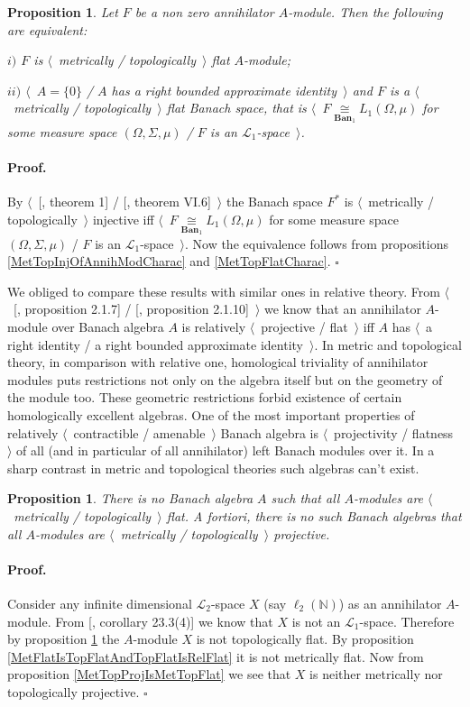 \documentclass[12pt]{article}
\newcommand{\isom}[1]{\mathop{\mathbin{\cong}}\limits_{#1}}
\newtheorem{proposition}[theorem]{Proposition}
\renewenvironment{proof}{\paragraph{Proof.}}{\hfill$\square$\medskip}
\begin{document}
\begin{proposition}\label{MetTopFlatAnnihModCharac} Let $F$ be a non zero annihilator $A$-module. Then the following are equivalent:

$i)$ $F$ is $\langle$~metrically / topologically~$\rangle$ flat $A$-module;

$ii)$ $\langle$~$A=\{0\}$ / $A$ has a right bounded approximate identity~$\rangle$ and $F$ is a $\langle$~metrically / topologically~$\rangle$ flat Banach space, that is $\langle$~$F\isom{\mathbf{Ban}_1}L_1(\Omega,\mu)$ for some measure space $(\Omega, \Sigma, \mu)$ / $F$ is an $\mathscr{L}_1$-space~$\rangle$.
\end{proposition}
\begin{proof} By $\langle$~[\cite{GrothMetrProjFlatBanSp}, theorem 1] / [\cite{StegRethNucOpL1LInfSp}, theorem VI.6]~$\rangle$ the Banach space $F^*$ is $\langle$~metrically / topologically~$\rangle$ injective iff $\langle$~$F\isom{\mathbf{Ban}_1}L_1(\Omega,\mu)$ for some measure space $(\Omega, \Sigma, \mu)$ / $F$ is an $\mathscr{L}_1$-space~$\rangle$. Now the equivalence follows from propositions \ref{MetTopInjOfAnnihModCharac} and \ref{MetTopFlatCharac}.
\end{proof}

We obliged to compare these results with similar ones in relative theory. From $\langle$~[\cite{RamsHomPropSemgroupAlg}, proposition 2.1.7] / [\cite{RamsHomPropSemgroupAlg}, proposition 2.1.10]~$\rangle$ we know that an annihilator $A$-module over Banach algebra $A$ is relatively $\langle$~projective / flat~$\rangle$ iff $A$ has $\langle$~a right identity / a right bounded approximate identity~$\rangle$.   
In metric and topological theory, in comparison with relative one, homological triviality of annihilator modules puts restrictions not only on the algebra itself but on the geometry of the module too. These geometric restrictions forbid existence of certain homologically excellent algebras. One of the most important properties of relatively $\langle$~contractible / amenable~$\rangle$ Banach algebra is $\langle$~projectivity / flatness~$\rangle$ of all (and in particular of all annihilator) left Banach modules over it. In a sharp contrast in metric and topological theories such algebras can't exist.

\begin{proposition} There is no Banach algebra $A$ such that all $A$-modules are  $\langle$~metrically / topologically~$\rangle$ flat. A fortiori, there is no such Banach algebras that all $A$-modules are $\langle$~metrically / topologically~$\rangle$ projective.
\end{proposition}
\begin{proof} Consider any infinite dimensional $\mathscr{L}_2$-space $X$ (say $\ell_2(\mathbb{N})$) as an annihilator $A$-module. From [\cite{DefFloTensNorOpId}, corollary 23.3(4)] we know that $X$ is not an $\mathscr{L}_1$-space. Therefore by proposition \ref{MetTopFlatAnnihModCharac} the $A$-module $X$ is not topologically flat. By proposition \ref{MetFlatIsTopFlatAndTopFlatIsRelFlat} it is not metrically flat. Now from proposition \ref{MetTopProjIsMetTopFlat} we see that $X$ is neither metrically nor topologically projective.
\end{proof}
\end{document}
